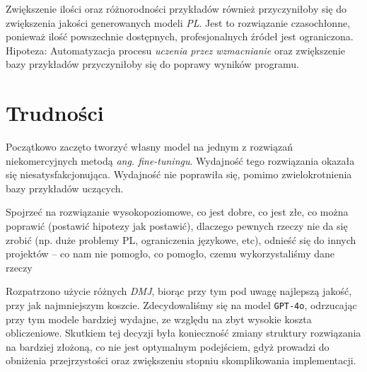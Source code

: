 Zwiększenie ilości oraz różnorodności przykładów również przyczyniłoby się do zwiększenia jakości generowanych modeli \textit{PL}. Jest to rozwiązanie czasochłonne, ponieważ ilość powszechnie dostępnych, profesjonalnych źródeł jest ograniczona.
Hipoteza: Automatyzacja procesu \textit{uczenia przez wzmacnianie} oraz zwiększenie bazy przykładów przyczyniłoby się do poprawy wyników programu.

\section{Trudności}

Początkowo zaczęto tworzyć własny model na jednym z rozwiązań niekomercyjnych metodą \textit{ang. fine-tuningu}. Wydajność tego rozwiązania okazała się niesatysfakcjonująca. Wydajność nie poprawiła się, pomimo zwielokrotnienia bazy przykładów uczących.

Spojrzeć na rozwiązanie wysokopoziomowe, co jest dobre, co jest złe, co można poprawić (postawić hipotezy jak postawić), dlaczego pewnych rzeczy nie da się zrobić (np. duże problemy PL, ograniczenia językowe, etc), odnieść się do innych projektów – co nam nie pomogło, co pomogło, czemu wykorzystaliśmy dane rzeczy

Rozpatrzono użycie różnych \textit{DMJ}, biorąc przy tym pod uwagę najlepszą jakość, przy jak najmniejszym koszcie. Zdecydowaliśmy się na model \texttt{GPT-4o}, odrzucając przy tym modele bardziej wydajne, ze względu na zbyt wysokie koszta obliczeniowe. Skutkiem tej decyzji była konieczność zmiany struktury rozwiązania na bardziej złożoną, co nie jest optymalnym podejściem, gdyż prowadzi do obniżenia przejrzystości oraz zwiększeniu stopniu skomplikowania implementacji.